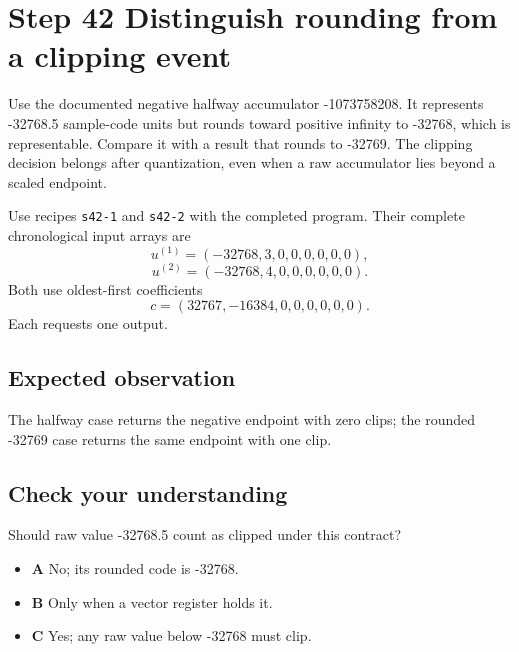 \section{Step 42 Distinguish rounding from a clipping event}\label{fir-s42}

Use the documented negative halfway accumulator -1073758208. It represents -32768.5 sample-code units but rounds toward positive infinity to -32768, which is representable. Compare it with a result that rounds to -32769. The clipping decision belongs after quantization, even when a raw accumulator lies beyond a scaled endpoint.

Use recipes \texttt{s42-1} and \texttt{s42-2} with the completed program.
Their complete chronological input arrays are
\[
 u^{(1)}=(-32768,3,0,0,0,0,0,0),
\]
\[
 u^{(2)}=(-32768,4,0,0,0,0,0,0).
\]
Both use oldest-first coefficients
\[
 c=(32767,-16384,0,0,0,0,0,0).
\]
Each requests one output.

\subsection{Expected observation}
The halfway case returns the negative endpoint with zero clips; the rounded -32769 case returns the same endpoint with one clip.

\subsection{Check your understanding}
Should raw value -32768.5 count as clipped under this contract?

\begin{itemize}
\item \textbf{A} No; its rounded code is -32768.
\item \textbf{B} Only when a vector register holds it.
\item \textbf{C} Yes; any raw value below -32768 must clip.
\end{itemize}
